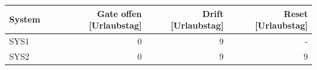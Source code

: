 \begin{tabular}{lrrr}
\toprule
System & Gate offen [Urlaubstag] & Drift [Urlaubstag] & Reset [Urlaubstag] \\
\midrule
SYS1 & 0 & 9 & - \\
SYS2 & 0 & 9 & 9 \\
\bottomrule
\end{tabular}
